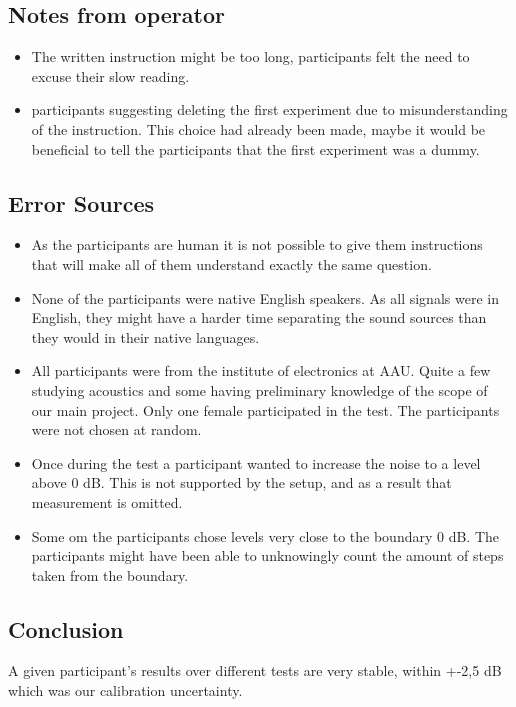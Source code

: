 \subsection{Notes from operator}
\begin{itemize}
\item The written instruction might be too long, participants felt the need to excuse their slow reading.
\item participants suggesting deleting the first experiment due to misunderstanding of the instruction. This choice had already been made, maybe it would be beneficial to tell the participants that the first experiment was a dummy. 
\end{itemize}

\subsection{Error Sources} \label{SubSec:ErrSouNoiAtt}
\begin{itemize}
\item As the participants are human it is not possible to give them instructions that will make all of them understand exactly the same question. 
\item None of the participants were native English speakers. As all signals were in English, they might have a harder time separating the sound sources than they would in their native languages. 
\item All participants were from the institute of electronics at AAU. Quite a few studying acoustics and some having preliminary knowledge of the scope of our main project. Only one female participated in the test. The participants were not chosen at random.  
\item Once during the test a participant wanted to increase the noise to a level above 0 dB. This is not supported by the setup, and as a result that measurement is omitted.
\item Some om the participants chose levels very close to the boundary 0 dB. The participants might have been able to unknowingly count the amount of steps taken from the boundary.  
\end{itemize}

\subsection{Conclusion}

A given participant's results over different tests are very stable, within +-2,5 dB which was our calibration uncertainty. 

